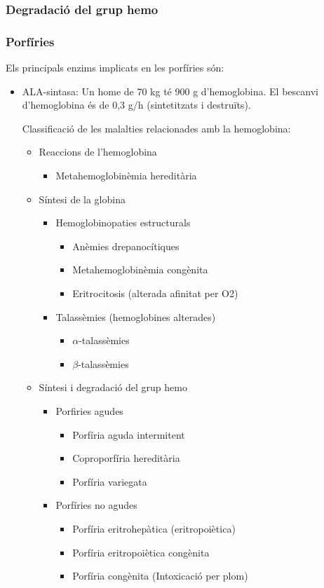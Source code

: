 \subsubsection*{Degradació del grup hemo}

\subsubsection{Porfíries}
Els principals enzims implicats en les porfíries són:
\begin{itemize}
\item ALA-sintasa: 
Un home de 70 kg té 900 g d'hemoglobina. El bescanvi d'hemoglobina és
de 0,3 g/h (sintetitzats i destruïts).

Classificació de les malalties relacionades amb la hemoglobina:
\begin{itemize}
\item Reaccions de l'hemoglobina
  \begin{itemize}
  \item Metahemoglobinèmia hereditària
  \end{itemize}

\item Síntesi de la globina
  \begin{itemize}
  \item Hemoglobinopaties estructurals
    \begin{itemize}
    \item Anèmies drepanocítiques 
    \item Metahemoglobinèmia congènita
    \item Eritrocitosis (alterada afinitat per O2)
    \end{itemize}
  \item Talassèmies (hemoglobines alterades)
    \begin{itemize}
    \item  $\alpha$-talassèmies
    \item $\beta$-talassèmies
    \end{itemize}
  \end{itemize}

\item Síntesi i degradació del grup hemo
  \begin{itemize}
  \item Porfiries agudes
    \begin{itemize}
    \item Porfíria aguda intermitent 
    \item Coproporfíria hereditària
    \item Porfíria variegata
   \end{itemize}
  \item Porfíries no agudes
    \begin{itemize}
    \item Porfíria eritrohepàtica (eritropoiètica) 
    \item Porfíria eritropoiètica congènita
    \item Porfíria congènita (Intoxicació per plom)
    \end{itemize}
  \end{itemize}


\end{itemize}
\end{itemize}
